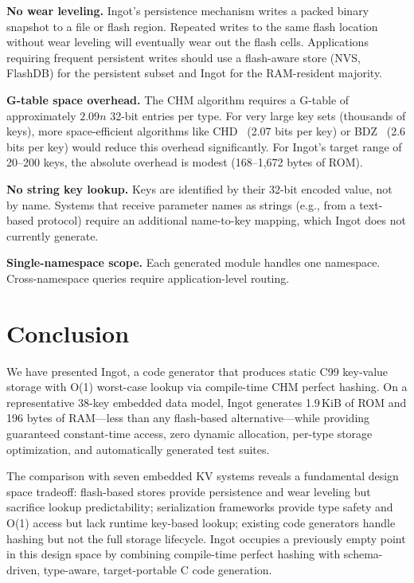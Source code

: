 \documentclass[10pt,twocolumn,letterpaper]{article}
\begin{document}
\textbf{No wear leveling.}  Ingot's persistence mechanism writes a
packed binary snapshot to a file or flash region.  Repeated writes to
the same flash location without wear leveling will eventually wear out
the flash cells.  Applications requiring frequent persistent writes
should use a flash-aware store (NVS, FlashDB) for the persistent
subset and Ingot for the RAM-resident majority.

\textbf{G-table space overhead.}  The CHM algorithm requires a
G-table of approximately $2.09n$ 32-bit entries per type.  For very
large key sets (thousands of keys), more space-efficient algorithms
like CHD~\cite{chd} (2.07 bits per key) or BDZ~\cite{bdz} (2.6 bits
per key) would reduce this overhead significantly.  For Ingot's target
range of 20--200 keys, the absolute overhead is modest (168--1,672
bytes of ROM).

\textbf{No string key lookup.}  Keys are identified by their 32-bit
encoded value, not by name.  Systems that receive parameter names as
strings (e.g., from a text-based protocol) require an additional
name-to-key mapping, which Ingot does not currently generate.

\textbf{Single-namespace scope.}  Each generated module handles one
namespace.  Cross-namespace queries require application-level routing.

\section{Conclusion}
\label{sec:conclusion}

We have presented Ingot, a code generator that produces static C99
key-value storage with O(1) worst-case lookup via compile-time CHM
perfect hashing.  On a representative 38-key embedded data model,
Ingot generates 1.9\,KiB of ROM and 196 bytes of RAM---less than any
flash-based alternative---while providing guaranteed constant-time
access, zero dynamic allocation, per-type storage optimization, and
automatically generated test suites.

The comparison with seven embedded KV systems reveals a fundamental
design space tradeoff: flash-based stores provide persistence and wear
leveling but sacrifice lookup predictability; serialization frameworks
provide type safety and O(1) access but lack runtime key-based lookup;
existing code generators handle hashing but not the full storage
lifecycle.  Ingot occupies a previously empty point in this design
space by combining compile-time perfect hashing with schema-driven,
type-aware, target-portable C code generation.
\end{document}

